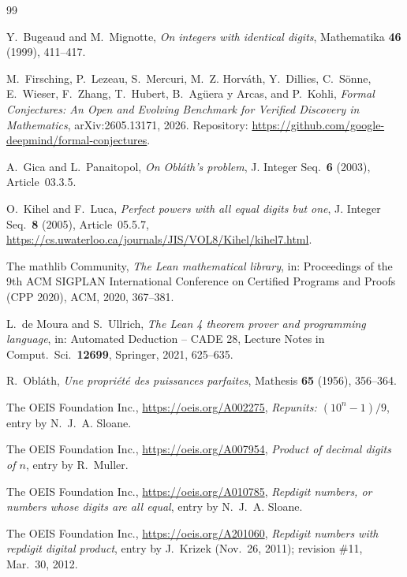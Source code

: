 \documentclass[11pt]{amsart}
\theoremstyle{plain}
\theoremstyle{definition}
\begin{document}
{\small
\begin{thebibliography}{99}

Y.~Bugeaud and M.~Mignotte, \emph{On integers with identical digits}, Mathematika \textbf{46} (1999), 411--417.

M.~Firsching, P.~Lezeau, S.~Mercuri, M.~Z. Horv\'ath, Y.~Dillies, C.~S\"onne, E.~Wieser, F.~Zhang, T.~Hubert, B.~Ag\"uera y Arcas, and P.~Kohli, \emph{Formal Conjectures: An Open and Evolving Benchmark for Verified Discovery in Mathematics}, arXiv:2605.13171, 2026. Repository: \url{https://github.com/google-deepmind/formal-conjectures}.

A.~Gica and L.~Panaitopol, \emph{On Obl\'ath's problem}, J. Integer Seq.\ \textbf{6} (2003), Article~03.3.5.

O.~Kihel and F.~Luca, \emph{Perfect powers with all equal digits but one}, J. Integer Seq.\ \textbf{8} (2005), Article~05.5.7, \url{https://cs.uwaterloo.ca/journals/JIS/VOL8/Kihel/kihel7.html}.

The mathlib Community, \emph{The Lean mathematical library}, in: Proceedings of the 9th ACM SIGPLAN International Conference on Certified Programs and Proofs (CPP 2020), ACM, 2020, 367--381.

L.~de Moura and S.~Ullrich, \emph{The Lean 4 theorem prover and programming language}, in: Automated Deduction -- CADE 28, Lecture Notes in Comput.\ Sci.\ \textbf{12699}, Springer, 2021, 625--635.

R.~Obl\'ath, \emph{Une propri\'et\'e des puissances parfaites}, Mathesis \textbf{65} (1956), 356--364.

The OEIS Foundation Inc., \url{https://oeis.org/A002275}, \emph{Repunits: $(10^n-1)/9$}, entry by N.~J.~A. Sloane.

The OEIS Foundation Inc., \url{https://oeis.org/A007954}, \emph{Product of decimal digits of $n$}, entry by R.~Muller.

The OEIS Foundation Inc., \url{https://oeis.org/A010785}, \emph{Repdigit numbers, or numbers whose digits are all equal}, entry by N.~J.~A. Sloane.

The OEIS Foundation Inc., \url{https://oeis.org/A201060}, \emph{Repdigit numbers with repdigit digital product}, entry by J.~Krizek (Nov.~26, 2011); revision \#11, Mar.~30, 2012.

\end{thebibliography}
}
\end{document}
